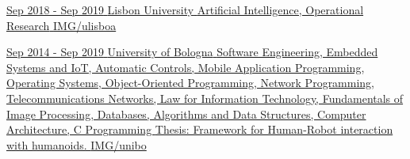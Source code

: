 \documentclass[paper=a4,fontsize=11pt, hidelinks]{temp} %
\begin{document}
\href{https://ciencias.ulisboa.pt/en}{
{Sep 2018 - Sep 2019}
{Lisbon University}
{Artificial Intelligence, Operational Research} 
{IMG/ulisboa}
}
\sepspace

\href{https://corsi.unibo.it/1cycle/ComputerScienceEngineering}{
{Sep 2014 - Sep 2019}
{University of Bologna}
{
     {%
    Software Engineering, Embedded Systems and IoT, Automatic Controls, Mobile Application Programming, Operating Systems, Object-Oriented Programming, Network Programming, Telecommunications Networks, Law for Information Technology, Fundamentals of Image Processing, Databases, Algorithms and Data Structures, Computer Architecture, C Programming
    }{%
    Thesis: Framework for Human-Robot interaction with humanoids.
    } 
} 
{IMG/unibo}
}
\end{document}
